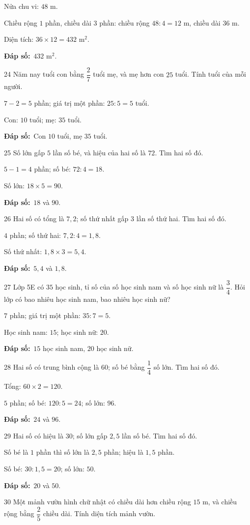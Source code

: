 \documentclass[11pt]{article}
\newif\ifsol \solfalse
\providecommand{\AnsWord}{Đáp số}
\newcommand{\dapso}[1]{\par\textbf{\AnsWord:}\ #1}
\newcommand{\probsol}[1]{%
  \begin{lrbox}{\solmeasure}\begin{minipage}{\dimexpr\linewidth-24pt\relax}#1\end{minipage}\end{lrbox}%
  \ifsol
    \begin{solbox}#1\end{solbox}%
  \else
    \setlength{\solht}{\dimexpr\ht\solmeasure+\dp\solmeasure+0.85cm\relax}%
    \ifdim\solht<1.35cm\setlength{\solht}{1.35cm}\fi
    \begin{tcolorbox}[colback=white,colframe=Line,boxrule=0.8pt,arc=5pt,
      left=8pt,right=8pt,top=4pt,bottom=4pt,height=\solht]{\footnotesize\color{Slate}\itshape\WorkWord}\end{tcolorbox}%
  \fi}
\newcommand{\gap}{\vspace{0.3cm}}
\def\WorkWord{Bài làm:}
\def\AnsWord{Đáp số}
\begin{document}
\probsol{
Nửa chu vi: $48$ m.\par Chiều rộng $1$ phần, chiều dài $3$ phần: chiều rộng $48:4=12$ m, chiều dài $36$ m.\par Diện tích: $36\times12=432$ m$^2$.
\dapso{$432$ m$^2$.}}
\gap
\begin{probbox}{24}{\relax}
Năm nay tuổi con bằng $\dfrac27$ tuổi mẹ, và mẹ hơn con $25$ tuổi. Tính tuổi của mỗi người.
\end{probbox}
\probsol{
$7-2=5$ phần; giá trị một phần: $25:5=5$ tuổi.\par Con: $10$ tuổi; mẹ: $35$ tuổi.
\dapso{Con $10$ tuổi, mẹ $35$ tuổi.}}
\gap
\begin{probbox}{25}{\relax}
Số lớn gấp $5$ lần số bé, và hiệu của hai số là $72$. Tìm hai số đó.
\end{probbox}
\probsol{
$5-1=4$ phần; số bé: $72:4=18$.\par Số lớn: $18\times5=90$.
\dapso{$18$ và $90$.}}
\gap
\begin{probbox}{26}{\relax}
Hai số có tổng là $7{,}2$; số thứ nhất gấp $3$ lần số thứ hai. Tìm hai số đó.
\end{probbox}
\probsol{
$4$ phần; số thứ hai: $7{,}2:4=1{,}8$.\par Số thứ nhất: $1{,}8\times3=5{,}4$.
\dapso{$5{,}4$ và $1{,}8$.}}
\gap
\begin{probbox}{27}{\relax}
Lớp 5E có $35$ học sinh, tỉ số của số học sinh nam và số học sinh nữ là $\dfrac34$. Hỏi lớp có bao nhiêu học sinh nam, bao nhiêu học sinh nữ?
\end{probbox}
\probsol{
$7$ phần; giá trị một phần: $35:7=5$.\par Học sinh nam: $15$; học sinh nữ: $20$.
\dapso{$15$ học sinh nam, $20$ học sinh nữ.}}
\gap
\begin{probbox}{28}{\relax}
Hai số có trung bình cộng là $60$; số bé bằng $\dfrac14$ số lớn. Tìm hai số đó.
\end{probbox}
\probsol{
Tổng: $60\times2=120$.\par $5$ phần; số bé: $120:5=24$; số lớn: $96$.
\dapso{$24$ và $96$.}}
\gap
\begin{probbox}{29}{\relax}
Hai số có hiệu là $30$; số lớn gấp $2{,}5$ lần số bé. Tìm hai số đó.
\end{probbox}
\probsol{
Số bé là $1$ phần thì số lớn là $2{,}5$ phần; hiệu là $1{,}5$ phần.\par Số bé: $30:1{,}5=20$; số lớn: $50$.
\dapso{$20$ và $50$.}}
\gap
\begin{probbox}{30}{\relax}
Một mảnh vườn hình chữ nhật có chiều dài hơn chiều rộng $15$ m, và chiều rộng bằng $\dfrac25$ chiều dài. Tính diện tích mảnh vườn.
\end{probbox}
\end{document}
